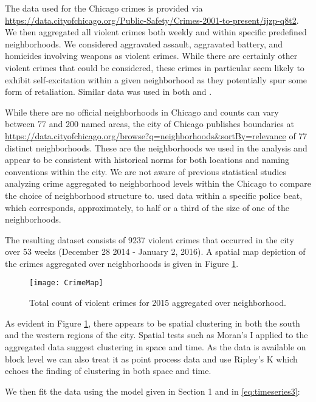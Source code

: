 \documentclass[11pt]{isuthesis}
\begin{document}
	The data used for the Chicago crimes is provided via \url{https://data.cityofchicago.org/Public-Safety/Crimes-2001-to-present/ijzp-q8t2}.  We then aggregated all violent crimes both weekly and within specific predefined neighborhoods.  We considered aggravated assault, aggravated battery, and homicides involving weapons as violent crimes.  While there are certainly other violent crimes that could be considered, these crimes in particular seem likely to exhibit self-excitation within a given neighborhood as they potentially spur some form of retaliation.  Similar data was used in both \cite{mohler2013modeling} and \cite{mohler2014marked}. 
	
	While there are no official neighborhoods in Chicago and counts can vary between 77 and 200 named areas, the city of Chicago publishes boundaries at \url{https://data.cityofchicago.org/browse?q=neighborhoods&sortBy=relevance} of 77 distinct neighborhoods.  These are the neighborhoods we used in the analysis and appear to be consistent with historical norms for both locations and naming conventions within the city.  We are not aware of previous statistical studies analyzing crime aggregated to neighborhood levels within the Chicago to compare the choice of neighborhood structure to.  \cite{mohler2013modeling} used data within a specific police beat, which corresponds, approximately, to half or a third of the size of one of the neighborhoods.
	
	The resulting dataset consists of 9237 violent crimes that occurred in the city over 53 weeks (December 28 2014 - January 2, 2016).  A spatial map depiction of the crimes aggregated over neighborhoods is given in Figure \ref{fig:SpatialOnly}.
	
	
	\begin{figure}[!htp]
		\centering
		\texttt{[image: CrimeMap]}
		\caption{Total count of violent crimes for 2015 aggregated over neighborhood.}\label{fig:SpatialOnly}
	\end{figure}
	
	As evident in Figure \ref{fig:SpatialOnly}, there appears to be spatial clustering in both the south and the western regions of the city.  Spatial tests such as Moran's I applied to the aggregated data suggest clustering in space and time.  As the data is available on block level we can also treat it as point process data and use Ripley's K which echoes the finding of  clustering in both space and time.
	
	We then fit the data using the model given in Section 1 and in \eqref{eq:timeseries3}:
	
\end{document}
